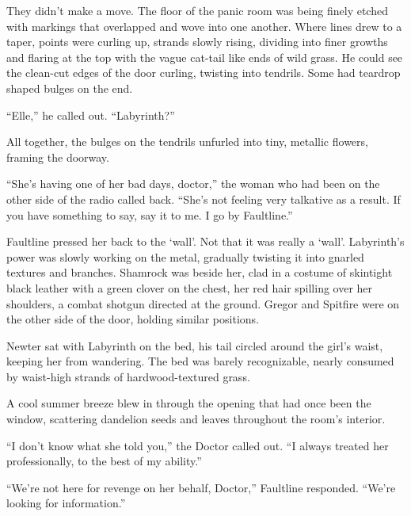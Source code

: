They didn't make a move. The floor of the panic room was being finely etched with markings that overlapped and wove into one another.  Where lines drew to a taper, points were curling up, strands slowly rising, dividing into finer growths and flaring at the top with the vague cat-tail like ends of wild grass.  He could see the clean-cut edges of the door curling, twisting into tendrils.  Some had teardrop shaped bulges on the end.



``Elle,'' he called out.  ``Labyrinth?''



All together, the bulges on the tendrils unfurled into tiny, metallic flowers, framing the doorway.



``She's having one of her bad days, doctor,'' the woman who had been on the other side of the radio called back.  ``She's not feeling very talkative as a result.  If you have something to say, say it to me.  I go by Faultline.''



\sectionbreak



Faultline pressed her back to the `wall'.  Not that it was really a `wall'.  Labyrinth's power was slowly working on the metal, gradually twisting it into gnarled textures and branches. Shamrock was beside her, clad in a costume of skintight black leather with a green clover on the chest, her red hair spilling over her shoulders, a combat shotgun directed at the ground.  Gregor and Spitfire were on the other side of the door, holding similar positions.



Newter sat with Labyrinth on the bed, his tail circled around the girl's waist, keeping her from wandering.  The bed was barely recognizable, nearly consumed by waist-high strands of hardwood-textured grass.



A cool summer breeze blew in through the opening that had once been the window, scattering dandelion seeds and leaves throughout the room's interior.



``I don't know what she told you,'' the Doctor called out.  ``I always treated her professionally, to the best of my ability.''



``We're not here for revenge on her behalf, Doctor,'' Faultline responded.  ``We're looking for information.''




